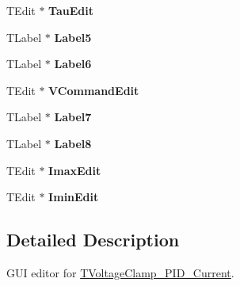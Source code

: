 \begin{DoxyCompactItemize}
\item 
\hypertarget{class_t_voltage_clamp___p_i_d___current_form_a06621fff98679081f57b4d743b4ce389}{T\+Edit $\ast$ {\bfseries Tau\+Edit}}\label{class_t_voltage_clamp___p_i_d___current_form_a06621fff98679081f57b4d743b4ce389}

\item 
\hypertarget{class_t_voltage_clamp___p_i_d___current_form_a98e545d99a480323f85376214b5cf211}{T\+Label $\ast$ {\bfseries Label5}}\label{class_t_voltage_clamp___p_i_d___current_form_a98e545d99a480323f85376214b5cf211}

\item 
\hypertarget{class_t_voltage_clamp___p_i_d___current_form_aabc8504486f8d5df90e130dce113dd6f}{T\+Label $\ast$ {\bfseries Label6}}\label{class_t_voltage_clamp___p_i_d___current_form_aabc8504486f8d5df90e130dce113dd6f}

\item 
\hypertarget{class_t_voltage_clamp___p_i_d___current_form_a7200e09c349616fa3a5412bb80df52aa}{T\+Edit $\ast$ {\bfseries V\+Command\+Edit}}\label{class_t_voltage_clamp___p_i_d___current_form_a7200e09c349616fa3a5412bb80df52aa}

\item 
\hypertarget{class_t_voltage_clamp___p_i_d___current_form_a14315f206ca0de91859d54b49be89da0}{T\+Label $\ast$ {\bfseries Label7}}\label{class_t_voltage_clamp___p_i_d___current_form_a14315f206ca0de91859d54b49be89da0}

\item 
\hypertarget{class_t_voltage_clamp___p_i_d___current_form_a0f60b8e081e97c26c915db148d84aba0}{T\+Label $\ast$ {\bfseries Label8}}\label{class_t_voltage_clamp___p_i_d___current_form_a0f60b8e081e97c26c915db148d84aba0}

\item 
\hypertarget{class_t_voltage_clamp___p_i_d___current_form_a8830cb4e81539ee6ff1690301c7096d5}{T\+Edit $\ast$ {\bfseries Imax\+Edit}}\label{class_t_voltage_clamp___p_i_d___current_form_a8830cb4e81539ee6ff1690301c7096d5}

\item 
\hypertarget{class_t_voltage_clamp___p_i_d___current_form_a55f1bfa9ce1f028b6d76eb33a8065576}{T\+Edit $\ast$ {\bfseries Imin\+Edit}}\label{class_t_voltage_clamp___p_i_d___current_form_a55f1bfa9ce1f028b6d76eb33a8065576}

\end{DoxyCompactItemize}


\subsection{Detailed Description}
G\+U\+I editor for \hyperlink{class_t_voltage_clamp___p_i_d___current}{T\+Voltage\+Clamp\+\_\+\+P\+I\+D\+\_\+\+Current}. 

